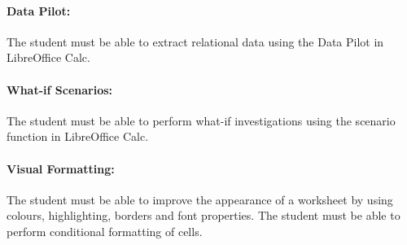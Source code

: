             \paragraph{Data Pilot:}
                The student must be able to extract relational data using the Data
                Pilot in LibreOffice Calc.

            \paragraph{What-if Scenarios:}
                The student must be able to perform what-if investigations using
                the scenario function in LibreOffice Calc.

            \paragraph{Visual Formatting:}
                The student must be able to improve the appearance of a worksheet
                by using colours, highlighting, borders and font properties. The
                student must be able to perform conditional formatting of cells.
